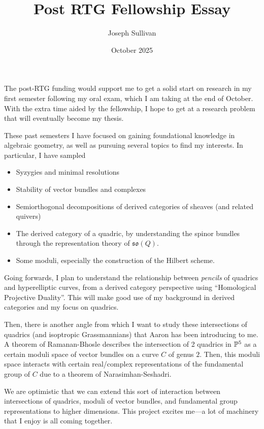 \documentclass[12pt]{article}
\title{Post RTG Fellowship Essay}
\author{Joseph Sullivan}
\date{October 2025}
\newcommand{\so}{\mathfrak{so}}
\begin{document}
\maketitle

The post-RTG funding would support me to get a solid start on research in my first semester following my oral exam, which I am taking at the end of October. With the extra time aided by the fellowship, I hope to get at a research problem that will eventually become my thesis.

These past semesters I have focused on gaining foundational knowledge in algebraic geometry, as well as pursuing several topics to find my interests. In particular, I have sampled
\begin{itemize}
    \item Syzygies and minimal resolutions
    \item Stability of vector bundles and complexes
    \item Semiorthogonal decompositions of derived categories of sheaves (and related quivers)
    \item The derived category of a quadric, by understanding the spinor bundles through the representation theory of $\so(Q)$.
    \item Some moduli, especially the construction of the Hilbert scheme.
\end{itemize}

Going forwards, I plan to understand the relationship between \textit{pencils} of quadrics and hyperelliptic curves, from a derived category perspective using ``Homological Projective Duality''. This will make good use of my background in derived categories and my focus on quadrics.

Then, there is another angle from which I want to study these intersections of quadrics (and isoptropic Grassmannians) that Aaron has been introducing to me. A theorem of Ramanan-Bhosle describes the intersection of 2 quadrics in $\P^5$ as a certain moduli space of vector bundles on a curve $C$ of genus $2$. Then, this moduli space interacts with certain real/complex representations of the fundamental group of $C$ due to a theorem of Narasimhan-Seshadri.

We are optimistic that we can extend this sort of interaction between intersections of quadrics, moduli of vector bundles, and fundamental group representations to higher dimensions. This project excites me---a lot of machinery that I enjoy is all coming together.
\end{document}
